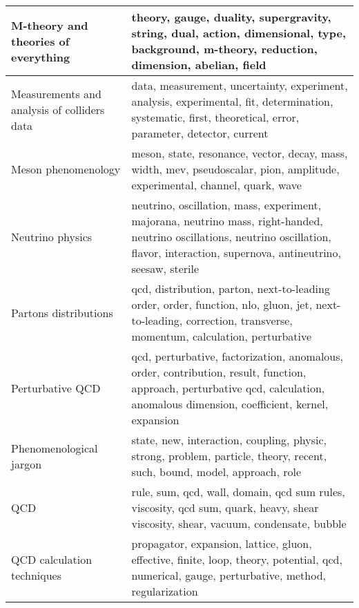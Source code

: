 \begin{longtable}[H]{p{}|p{}}
M-theory and theories of everything                 &                                                                  theory, gauge, duality, supergravity, string, dual, action, dimensional, type, background, m-theory, reduction, dimension, abelian, field \\ \midrule
Measurements and analysis of colliders data         &                                                data, measurement, uncertainty, experiment, analysis, experimental, fit, determination, systematic, first, theoretical, error, parameter, detector, current \\ \midrule
Meson phenomenology                                 &                                                                                meson, state, resonance, vector, decay, mass, width, mev, pseudoscalar, pion, amplitude, experimental, channel, quark, wave \\ \midrule
Neutrino physics                                    &                 neutrino, oscillation, mass, experiment, majorana, neutrino mass, right-handed, neutrino oscillations, neutrino oscillation, flavor, interaction, supernova, antineutrino, seesaw, sterile \\ \midrule
Partons distributions                               &                                           qcd, distribution, parton, next-to-leading order, order, function, nlo, gluon, jet, next-to-leading, correction, transverse, momentum, calculation, perturbative \\ \midrule
Perturbative QCD                                    &                           qcd, perturbative, factorization, anomalous, order, contribution, result, function, approach, perturbative qcd, calculation, anomalous dimension, coefficient, kernel, expansion \\ \midrule
Phenomenological jargon                             &                                                                                   state, new, interaction, coupling, physic, strong, problem, particle, theory, recent, such, bound, model, approach, role \\ \midrule
QCD                                                 &                                                                          rule, sum, qcd, wall, domain, qcd sum rules, viscosity, qcd sum, quark, heavy, shear viscosity, shear, vacuum, condensate, bubble \\ \midrule
QCD calculation techniques                          &                                                             propagator, expansion, lattice, gluon, effective, finite, loop, theory, potential, qcd, numerical, gauge, perturbative, method, regularization \\ \midrule

\end{longtable}
